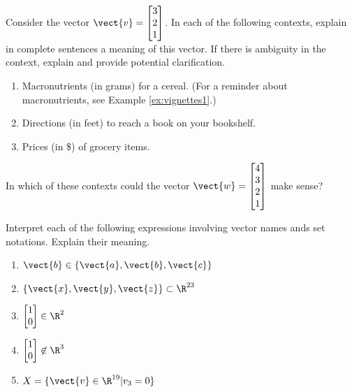 \bsp
\begin{activity}
\label{activity:interpretting_vectors}
Consider the vector $\vect{v}=\begin{bmatrix}3\\2\\1\end{bmatrix}$.
In each of the following contexts, explain in complete sentences a meaning of this vector.   
If there is ambiguity in the context, explain and provide potential clarification.
\begin{enumerate}[label=(\alph*)]
\item Macronutrients (in grams) for a cereal.  (For a reminder about macronutrients, see Example \ref{ex:vignettes1}.)
\item Directions (in feet) to reach a book on your bookshelf.
\item Prices (in \$) of grocery items.
\end{enumerate}
In which of these contexts could the vector $\vect{w}=\begin{bmatrix}4\\3\\2\\1\end{bmatrix}$ make sense?
\end{activity}
\esp


\bsp
\begin{activity}
\label{activity:interpretting_set_notation}
Interpret each of the following expressions involving vector names ands set notations.  Explain their meaning.
\begin{enumerate}[label=(\alph*)]
\item $\vect{b} \in \{\vect{a}, \vect{b}, \vect{c}\}$
\item $\{\vect{x}, \vect{y}, \vect{z}\}\subset \R^{23}$
\item $\begin{bmatrix}1\\0\end{bmatrix}\in  \R^2$
\item $\begin{bmatrix}1\\0\end{bmatrix}\not\in  \R^3$
\item $X  = \{\vect{v}\in \R^{19}| v_3 = 0\}$ 
\end{enumerate}
\end{activity}
\esp


